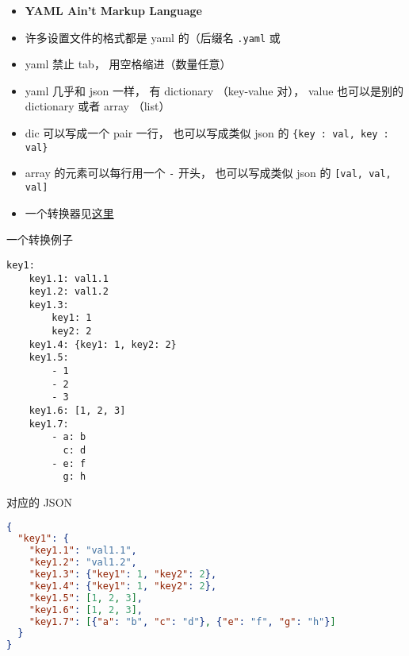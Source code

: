 
\begin{issues}
\issueDraft
\end{issues}


\begin{itemize}
\item \textbf{YAML Ain't Markup Language}
\item 许多设置文件的格式都是 yaml 的（后缀名 \verb`.yaml` 或 
\item yaml 禁止 tab， 用空格缩进（数量任意）
\item yaml 几乎和 json 一样， 有 dictionary （key-value 对）， value 也可以是别的 dictionary 或者 array （list）
\item dic 可以写成一个 pair 一行， 也可以写成类似 json 的 \verb|{key : val, key : val}|
\item array 的元素可以每行用一个 \verb|-| 开头， 也可以写成类似 json 的 \verb|[val, val, val]|
\item 一个转换器见\href{https://onlineyamltools.com/convert-yaml-to-json}{这里}
\end{itemize}

一个转换例子
\begin{lstlisting}[language=none]
key1:
    key1.1: val1.1
    key1.2: val1.2
    key1.3:
        key1: 1
        key2: 2
    key1.4: {key1: 1, key2: 2}
    key1.5:
        - 1
        - 2
        - 3
    key1.6: [1, 2, 3]
    key1.7:
        - a: b
          c: d
        - e: f
          g: h
\end{lstlisting}
对应的 JSON
\begin{lstlisting}[language=json]
{
  "key1": {
    "key1.1": "val1.1",
    "key1.2": "val1.2",
    "key1.3": {"key1": 1, "key2": 2},
    "key1.4": {"key1": 1, "key2": 2},
    "key1.5": [1, 2, 3],
    "key1.6": [1, 2, 3],
    "key1.7": [{"a": "b", "c": "d"}, {"e": "f", "g": "h"}]
  }
}
\end{lstlisting}
